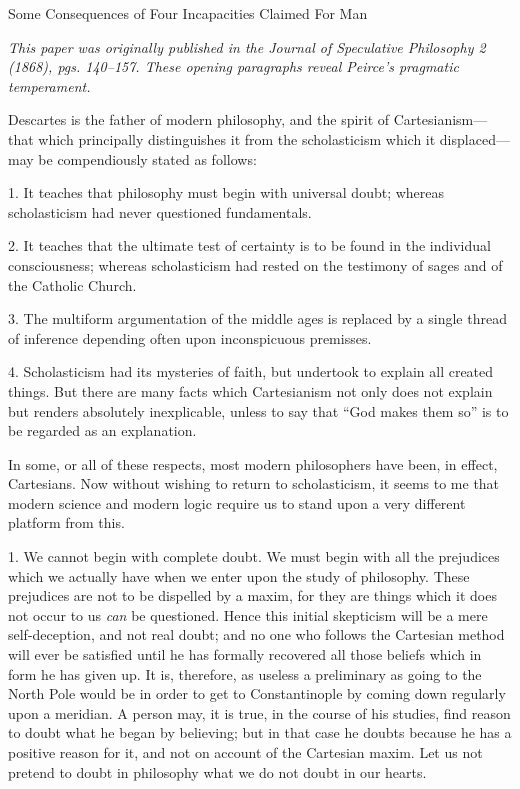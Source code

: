 \documentclass[]{article}
\newcommand{\hbreak}{\par\noindent\begin{tabular*}{\linewidth}{c}\hline\hline\end{tabular*}\par}
\newcommand*{\itemtitle}[1]{\pagebreak[2]\hbreak\begin{center}{\Large\sc #1}\end{center}}
\newcommand*{\itemcomment}[1]{\noindent\emph{#1}}
\begin{document}
\itemtitle{[from] Some Consequences of Four Incapacities Claimed For Man}
\itemcomment{This paper was originally published in the \emph{Journal of Speculative Philosophy} 2 (1868), pgs. 140--157. These opening paragraphs reveal Peirce's pragmatic temperament.}

Descartes is the father of modern philosophy, and the spirit of Cartesianism--- that which principally distinguishes it from the scholasticism which it displaced--- may be compendiously stated as follows:

1. It teaches that philosophy must begin with universal doubt; whereas scholasticism had never questioned fundamentals.

2. It teaches that the ultimate test of certainty is to be found in the individual consciousness; whereas scholasticism had rested on the testimony of sages and of the Catholic Church.

3. The multiform argumentation of the middle ages is replaced by a single thread of inference depending often upon inconspicuous premisses.

4. Scholasticism had its mysteries of faith, but undertook to explain all created things. But there are many facts which Cartesianism not only does not explain but renders absolutely inexplicable, unless to say that ``God makes them so'' is to be regarded as an explanation.

In some, or all of these respects, most modern philosophers have been, in effect, Cartesians. Now without wishing to return to scholasticism, it seems to me that modern science and modern logic require us to stand upon a very different platform from this.

1. We cannot begin with complete doubt. We must begin with all the prejudices which we actually have when we enter upon the study of philosophy. These prejudices are not to be dispelled by a maxim, for they are things which it does not occur to us \emph{can} be questioned. Hence this initial skepticism will be a mere self-deception, and not real doubt; and no one who follows the Cartesian method will ever be satisfied until he has formally recovered all those beliefs which in form he has given up. It is, therefore, as useless a preliminary as going to the North Pole would be in order to get to Constantinople by coming down regularly upon a meridian. A person may, it is true, in the course of his studies, find reason to doubt what he began by believing; but in that case he doubts because he has a positive reason for it, and not on account of the Cartesian maxim. Let us not pretend to doubt in philosophy what we do not doubt in our hearts.
\end{document}
